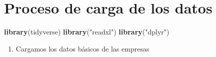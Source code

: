 \documentclass[
  11pt,
]{book}
\newenvironment{Shaded}{\begin{snugshade}}{\end{snugshade}}
\newcommand{\KeywordTok}[1]{\textcolor[rgb]{0.13,0.29,0.53}{\textbf{#1}}}
\newcommand{\NormalTok}[1]{#1}
\newcommand{\StringTok}[1]{\textcolor[rgb]{0.31,0.60,0.02}{#1}}
\providecommand{\tightlist}{%
  \setlength{\itemsep}{0pt}\setlength{\parskip}{0pt}}
\begin{document}
\hypertarget{proceso-de-carga-de-los-datos}{%
\section{Proceso de carga de los
datos}\label{proceso-de-carga-de-los-datos}}

\begin{Shaded}
\begin{Highlighting}[]
\KeywordTok{library}\NormalTok{(tidyverse)}
\KeywordTok{library}\NormalTok{(}\StringTok{"readxl"}\NormalTok{)}
\KeywordTok{library}\NormalTok{(}\StringTok{"dplyr"}\NormalTok{)}
\end{Highlighting}
\end{Shaded}

\begin{enumerate}
\def\labelenumi{\arabic{enumi}.}
\tightlist
\item
  Cargamos los datos básicos de las empresas
\end{enumerate}
\end{document}
